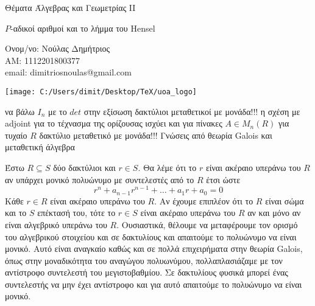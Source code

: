 \documentclass[oneside,a4paper]{article}
\newcommand {\tl}{\textlatin}
\begin{document}
	
	
	\begin{framed}	
		\begin{center}
			\huge Θέματα Άλγεβρας και Γεωμετρίας \tl{II}
		\end{center}
		\begin{center}
			\huge $P$-αδικοί αριθμοί και το λήμμα του \tl{Hensel}
		\end{center}
		\vspace{0.3truecm}
		\begin{center}
			Ονομ/νο: Νούλας Δημήτριος\\
			ΑΜ: 1112201800377\\
			\tl{email}: \tl{dimitriosnoulas@gmail.com} \\
			\vspace{0.1cm}
			
		\end{center}
		\vspace{0.3truecm}
	\end{framed}
	\vspace*{\fill}
	\begin{center}
	\texttt{[image: C:/Users/dimit/Desktop/TeX/uoa\_logo]}
	\end{center}
\vspace{1cm}
\pagebreak

να βάλω $I_n$ με το $det$ στην εξίσωση
δακτύλιοι μεταθετικοί με μονάδα!!!
η σχέση με \tl{adjoint} για το τέχνασμα της ορίζουσας ισχύει και για πίνακες $A \in M_n(R)$ για τυχαίο $R$ δακτύλιο μεταθετικό με μονάδα!!!
\noindent Γνώσεις από θεωρία \tl{Galois} και μεταθετική άλγεβρα 



\noindent Έστω $R\subseteq S$ δύο δακτύλιοι και $r \in S$. Θα λέμε ότι το $r$ είναι ακέραιο υπεράνω του $R$ αν υπάρχει μονικό πολυώνυμο με συντελεστές από το $R$ έτσι ώστε $$r^n + a_{n-1}r^{n-1} + \ldots + a_1 r + a_0 = 0$$ Κάθε $r \in R$ είναι ακέραιο υπεράνω του $R$. Aν έχουμε επιπλέον ότι το $R$ είναι σώμα και το $S$ επέκτασή του, τότε το $r \in S$ είναι ακέραιο υπεράνω του $R$ αν και μόνο αν είναι αλγεβρικό υπεράνω του $R$. Ουσιαστικά, θέλουμε να μεταφέρουμε τον ορισμό του αλγεβρικού στοιχείου και σε δακτυλίους και απαιτούμε το πολυώνυμο να είναι μονικό. Αυτό είναι αναγκαίο καθώς και σε πολλά επιχειρήματα στην θεωρία \tl{Galois}, όπως στην μοναδικότητα του αναγώγου πολυωνύμου, πολλαπλασιάζαμε με τον αντίστροφο συντελεστή του μεγιστοβαθμίου. Σε δακτυλίους φυσικά μπορεί ένας συντελεστής να μην έχει αντίστροφο και για αυτό απαιτούμε το πολυώνυμο να είναι μονικό.
\end{document}
